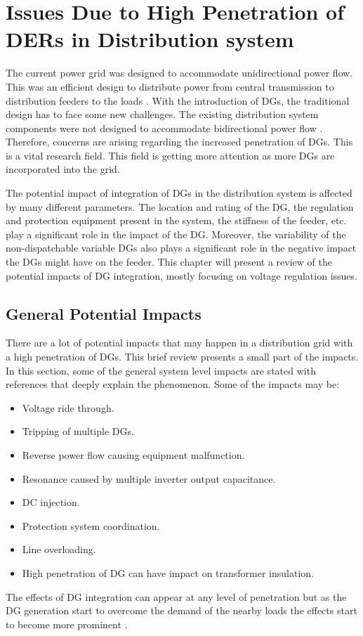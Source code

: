 \section{Issues Due to High Penetration of DERs in Distribution system}
The current power grid was designed to accommodate unidirectional power flow. This was an efficient design to distribute power from central transmission to distribution feeders to the loads \cite{HPPV}.  With the introduction of DGs, the traditional design has to face some new challenges. The existing distribution system components were not designed to accommodate bidirectional power flow \cite{HPPV}. Therefore, concerns are arising regarding the increased penetration of DGs. This is a vital research field. This field is getting more attention as more DGs are incorporated into the grid. 

The potential impact of integration of DGs in the distribution system is affected by many different parameters. The location and rating of the DG, the regulation and protection equipment present in the system, the stiffness of the feeder, etc. play a significant role in the impact of the DG. Moreover, the variability of the non-dispatchable variable DGs also plays a significant role in the negative impact the DGs might have on the feeder. This chapter will present a review of the potential impacts of DG integration, mostly focusing on voltage regulation issues.

\subsection{General Potential Impacts}
There are a lot of potential impacts that may happen in a distribution grid with a high penetration of DGs. This brief review presents a small part of the impacts. In this section, some of the general system level impacts are stated with references that deeply explain the phenomenon. Some of the impacts may be:
\begin{itemize}
    \item Voltage ride through. \cite{GPI1}
    \item Tripping of multiple DGs.\cite{GP2}
    \item Reverse power flow causing equipment malfunction. \cite{GP3}
    \item Resonance caused by multiple inverter output capacitance. \cite{GP4}
    \item DC injection. \cite{GP5}
    \item Protection system coordination. \cite{GP3}
    \item Line overloading. \cite{GP6}
    \item High penetration of DG can have impact on transformer insulation. \cite{GP4}
\end{itemize}
The effects of DG integration can appear at any level of penetration but as the DG generation start to overcome the demand of the nearby loads the effects start to become more prominent \cite{Th_ali}.

